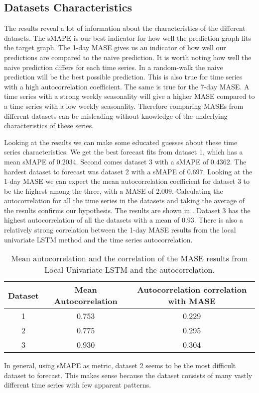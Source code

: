 
\subsection{Datasets Characteristics}
The results reveal a lot of information about the characteristics of the different datasets.
The sMAPE is our best indicator for how well the prediction graph fits the target graph.
The 1-day MASE gives us an indicator of how well our predictions are compared to the naive
prediction. It is worth noting how well the naive prediction differs
for each time series. In a random-walk the naive prediction will be the best possible prediction.
This is also true for time series with a high autocorrelation coefficient.
The same is true for the 7-day MASE. A time series with a strong weekly seasonality will
give a higher MASE compared to a time series with a low weekly seasonality.
Therefore comparing MASEs from different datasets can be misleading without knowledge of
the underlying characteristics of these series.

Looking at the results we can make some educated guesses about these time series characteristics.
We get the best forecast fits from dataset 1, which has a mean sMAPE of $0.2034$.
Second comes dataset 3 with a sMAPE of $0.4362$. The hardest dataset to forecast was dataset 2 with a
sMAPE of $0.697$. Looking at the 1-day MASE we can expect the mean autocorrelation coefficient for
dataset 3 to be the highest among the three, with a MASE of $2.009$.
Calculating the autocorrelation for all the time series in the datasets and
taking the average of the results confirms our hypothesis. The results are shown in .
Dataset 3 has the highest autocorrelation of all the datasets with a mean
of $0.93$. There is also a relatively strong correlation between the 1-day MASE results
from the local univariate LSTM method and the time series autocorrelation.

\begin{table}[htbp]
  \caption{Mean autocorrelation and the correlation of the MASE results from Local Univariate LSTM and the autocorrelation.}
  \centering
  \label{tab:datasets-autocorrelation}
  \begin{tabular}{|c|c|c|}\hline\hline
    Dataset & Mean Autocorrelation & Autocorrelation correlation with MASE \\\hline
    1       & 0.753                & 0.229                                 \\\hline
    2       & 0.775                & 0.295                                 \\\hline
    3       & 0.930                & 0.304                                 \\\hline
  \end{tabular}
\end{table}%


In general, using sMAPE as metric, dataset 2 seems to be the most difficult dataset to forecast.
This makes sense because the dataset consists of many vastly different time series
with few apparent patterns.